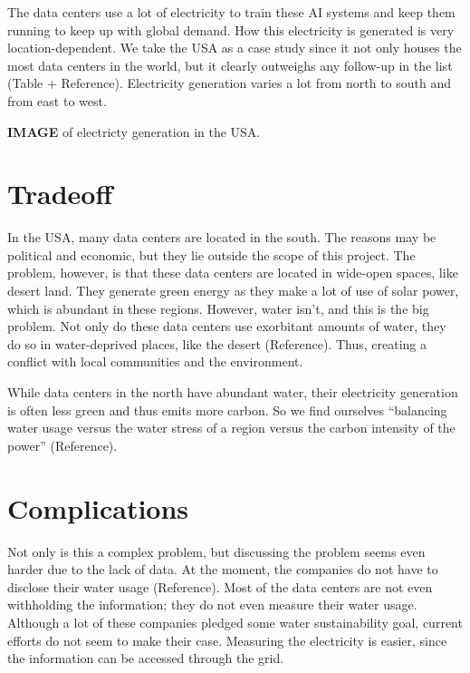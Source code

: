 \documentclass[
]{article}
\begin{document}
The data centers use a lot of electricity to train these AI systems and
keep them running to keep up with global demand. How this electricity is
generated is very location-dependent. We take the USA as a case study
since it not only houses the most data centers in the world, but it
clearly outweighs any follow-up in the list (Table + Reference).
Electricity generation varies a lot from north to south and from east to
west.

\textbf{IMAGE} of electricty generation in the USA.

\section{Tradeoff}\label{tradeoff}

In the USA, many data centers are located in the south. The reasons may
be political and economic, but they lie outside the scope of this
project. The problem, however, is that these data centers are located in
wide-open spaces, like desert land. They generate green energy as they
make a lot of use of solar power, which is abundant in these regions.
However, water isn't, and this is the big problem. Not only do these
data centers use exorbitant amounts of water, they do so in
water-deprived places, like the desert (Reference). Thus, creating a
conflict with local communities and the environment.

While data centers in the north have abundant water, their electricity
generation is often less green and thus emits more carbon. So we find
ourselves ``balancing water usage versus the water stress of a region
versus the carbon intensity of the power'' (Reference).

\section{Complications}\label{complications}

Not only is this a complex problem, but discussing the problem seems
even harder due to the lack of data. At the moment, the companies do not
have to disclose their water usage (Reference). Most of the data centers
are not even withholding the information; they do not even measure their
water usage. Although a lot of these companies pledged some water
sustainability goal, current efforts do not seem to make their case.
Measuring the electricity is easier, since the information can be
accessed through the grid.
\end{document}
